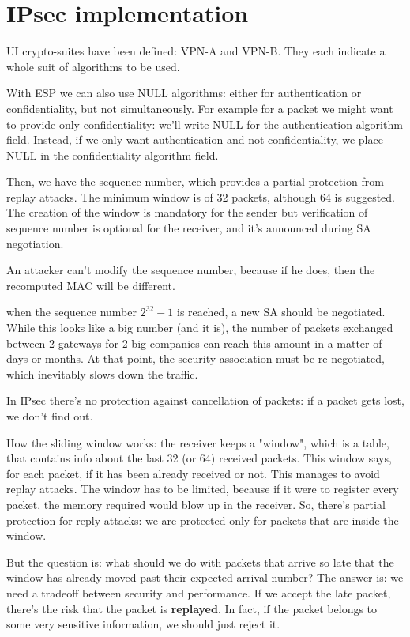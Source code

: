 \section{IPsec implementation}
UI crypto-suites have been defined: VPN-A and VPN-B. They each indicate a whole suit of algorithms to be used.

With ESP we can also use NULL algorithms: either for authentication or confidentiality, but not simultaneously. For example for a packet we might want to provide only confidentiality: we'll write NULL for the authentication algorithm field. Instead, if we only want authentication and not confidentiality, we place NULL in the confidentiality algorithm field.

Then, we have the sequence number, which provides a partial protection from replay attacks. The minimum window is of 32 packets, although 64 is suggested. The creation of the window is mandatory for the sender but verification of sequence number is optional for the receiver, and it's announced during SA negotiation.

An attacker can't modify the sequence number, because if he does, then the recomputed MAC will be different.

when the sequence number $2^{32}-1$ is reached, a new SA should be negotiated. While this looks like a big number (and it is), the number of packets exchanged between 2 gateways for 2 big companies can reach this amount in a matter of days or months. At that point, the security association must be re-negotiated, which inevitably slows down the traffic.

In IPsec there's no protection against cancellation of packets: if a packet gets lost, we don't find out.

How the sliding window works: the receiver keeps a "window", which is a table, that contains info about the last 32 (or 64) received packets. This window says, for each packet, if it has been already received or not. This manages to avoid replay attacks. The window has to be limited, because if it were to register every packet, the memory required would blow up in the receiver. So, there's partial protection for reply attacks: we are protected only for packets that are inside the window.

But the question is: what should we do with packets that arrive so late that the window has already moved past their expected arrival number? The answer is: we need a tradeoff between security and performance. If we accept the late packet, there's the risk that the packet is \textbf{replayed}. In fact, if the packet belongs to some very sensitive information, we should just reject it.

